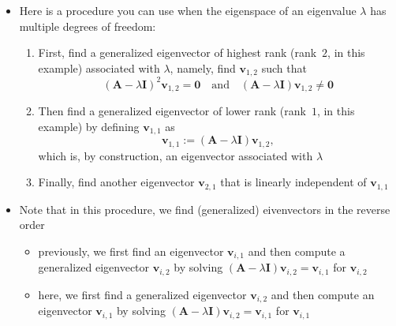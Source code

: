 \documentclass[12pt,a4paper]{article}
\begin{document}
\begin{itemize}
\begin{itemize}
  \item Here is a procedure you can use when the eigenspace of an eigenvalue $\lambda$ has multiple degrees of freedom:
    \begin{enumerate}
    \item First, find a generalized eigenvector of highest rank (rank~$2$, in this example) associated with $\lambda$,
      namely, find $\bm{v}_{1,2}$ such that
      \begin{equation}\label{eq:cond1}%
        (\bm{A}-\lambda \bm{I})^{2}\bm{v}_{1,2} = \bm{0}
        \quad\text{and}\quad
        (\bm{A}-\lambda \bm{I})\bm{v}_{1,2} \neq \bm{0}
      \end{equation}
    \item Then find a generalized eigenvector of lower rank (rank~$1$, in this example)
      by defining $\bm{v}_{1,1}$ as
      \begin{equation}\label{eq:cond2}%
        \bm{v}_{1,1} := (\bm{A}-\lambda \bm{I})\bm{v}_{1,2},
      \end{equation}
      which is, by construction, an eigenvector associated with $\lambda$
    \item Finally, find another eigenvector $\bm{v}_{2,1}$ that is linearly independent of $\bm{v}_{1,1}$
    \end{enumerate}

  \item Note that in this procedure, we find (generalized) eivenvectors in the reverse order
    \begin{itemize}
    \item previously, we first find an eigenvector $\bm{v}_{i,1}$ and then compute a generalized eigenvector $\bm{v}_{i,2}$
      by solving $(\bm{A}-\lambda \bm{I})\bm{v}_{i,2} = \bm{v}_{i,1}$ for $\bm{v}_{i,2}$
    \item here, we first find a generalized eigenvector $\bm{v}_{i,2}$ and then compute an eigenvector $\bm{v}_{i,1}$
      by solving $(\bm{A}-\lambda \bm{I})\bm{v}_{i,2} = \bm{v}_{i,1}$ for $\bm{v}_{i,1}$
    \end{itemize}


\end{itemize}
\end{itemize}
\end{document}
